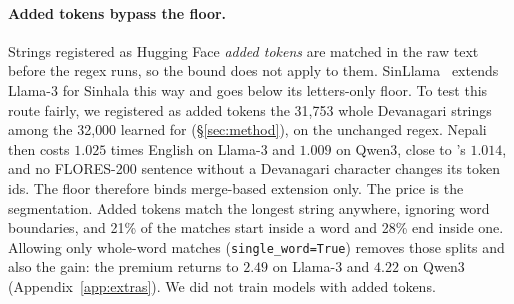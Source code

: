 \paragraph{Added tokens bypass the floor.} Strings registered as Hugging Face \emph{added tokens} are matched in the raw text before the regex runs, so the bound does not apply to them. SinLlama~\citep{aravinda2025sinllama} extends Llama-3 for Sinhala this way and goes below its letters-only floor. To test this route fairly, we registered as added tokens the 31{,}753 whole Devanagari strings among the 32{,}000 learned for \RII{} (\S\ref{sec:method}), on the unchanged regex. Nepali then costs $1.025$ times English on Llama-3 and $1.009$ on Qwen3, close to \RII{}'s $1.014$, and no FLORES-200 sentence without a Devanagari character changes its token ids. The floor therefore binds merge-based extension only. The price is the segmentation. Added tokens match the longest string anywhere, ignoring word boundaries, and 21\% of the matches start inside a word and 28\% end inside one. Allowing only whole-word matches (\texttt{single\_word=True}) removes those splits and also the gain: the premium returns to $2.49$ on Llama-3 and $4.22$ on Qwen3 (Appendix~\ref{app:extras}). We did not train models with added tokens.
